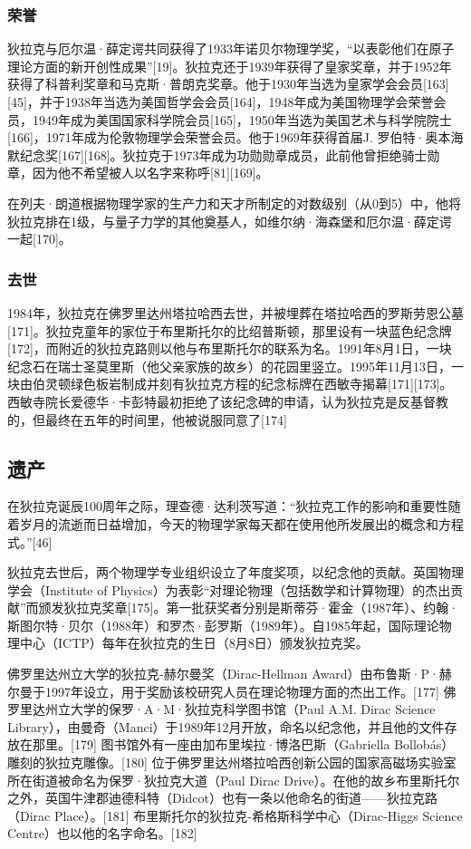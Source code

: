 \subsubsection{荣誉}  
狄拉克与厄尔温·薛定谔共同获得了1933年诺贝尔物理学奖，“以表彰他们在原子理论方面的新开创性成果”[19]。狄拉克还于1939年获得了皇家奖章，并于1952年获得了科普利奖章和马克斯·普朗克奖章。他于1930年当选为皇家学会会员[163][45]，并于1938年当选为美国哲学会会员[164]，1948年成为美国物理学会荣誉会员，1949年成为美国国家科学院会员[165]，1950年当选为美国艺术与科学院院士[166]，1971年成为伦敦物理学会荣誉会员。他于1969年获得首届J. 罗伯特·奥本海默纪念奖[167][168]。狄拉克于1973年成为功勋勋章成员，此前他曾拒绝骑士勋章，因为他不希望被人以名字来称呼[81][169]。

在列夫·朗道根据物理学家的生产力和天才所制定的对数级别（从0到5）中，他将狄拉克排在1级，与量子力学的其他奠基人，如维尔纳·海森堡和厄尔温·薛定谔一起[170]。
\subsubsection{去世}
1984年，狄拉克在佛罗里达州塔拉哈西去世，并被埋葬在塔拉哈西的罗斯劳恩公墓[171]。狄拉克童年的家位于布里斯托尔的比绍普斯顿，那里设有一块蓝色纪念牌[172]，而附近的狄拉克路则以他与布里斯托尔的联系为名。1991年8月1日，一块纪念石在瑞士圣莫里斯（他父亲家族的故乡）的花园里竖立。1995年11月13日，一块由伯灵顿绿色板岩制成并刻有狄拉克方程的纪念标牌在西敏寺揭幕[171][173]。西敏寺院长爱德华·卡彭特最初拒绝了该纪念碑的申请，认为狄拉克是反基督教的，但最终在五年的时间里，他被说服同意了[174]
\subsection{遗产}
在狄拉克诞辰100周年之际，理查德·达利茨写道：“狄拉克工作的影响和重要性随着岁月的流逝而日益增加，今天的物理学家每天都在使用他所发展出的概念和方程式。”[46]

狄拉克去世后，两个物理学专业组织设立了年度奖项，以纪念他的贡献。英国物理学会（Institute of Physics）为表彰“对理论物理（包括数学和计算物理）的杰出贡献”而颁发狄拉克奖章[175]。第一批获奖者分别是斯蒂芬·霍金（1987年）、约翰·斯图尔特·贝尔（1988年）和罗杰·彭罗斯（1989年）。自1985年起，国际理论物理中心（ICTP）每年在狄拉克的生日（8月8日）颁发狄拉克奖。

佛罗里达州立大学的狄拉克-赫尔曼奖（Dirac-Hellman Award）由布鲁斯·P·赫尔曼于1997年设立，用于奖励该校研究人员在理论物理方面的杰出工作。[177] 佛罗里达州立大学的保罗·A·M·狄拉克科学图书馆（Paul A.M. Dirac Science Library），由曼奇（Manci）于1989年12月开放，命名以纪念他，并且他的文件存放在那里。[179] 图书馆外有一座由加布里埃拉·博洛巴斯（Gabriella Bollobás）雕刻的狄拉克雕像。[180] 位于佛罗里达州塔拉哈西创新公园的国家高磁场实验室所在街道被命名为保罗·狄拉克大道（Paul Dirac Drive）。在他的故乡布里斯托尔之外，英国牛津郡迪德科特（Didcot）也有一条以他命名的街道——狄拉克路（Dirac Place）。[181] 布里斯托尔的狄拉克-希格斯科学中心（Dirac-Higgs Science Centre）也以他的名字命名。[182]

